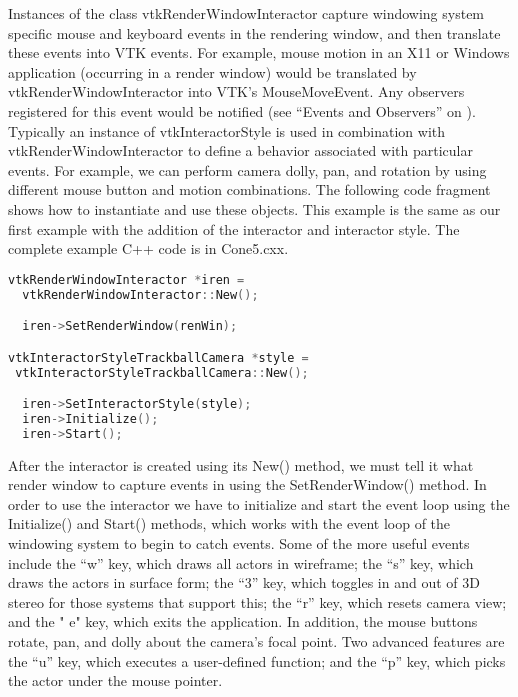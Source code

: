 \begin{description}[leftmargin=0cm,labelindent=0cm]
Instances of the class vtkRenderWindowInteractor capture windowing system specific mouse and keyboard events in the rendering window, and then translate these events into VTK events. For example, mouse motion in an X11 or Windows application (occurring in a render window) would be translated by vtkRenderWindowInteractor into VTK's MouseMoveEvent. Any observers registered for this event would be notified (see ``Events and Observers'' on \pageref{sub:examples_events_observers} ). Typically an instance of vtkInteractorStyle is used in combination with vtkRenderWindowInteractor to define a behavior associated with particular events. For example, we can perform camera dolly, pan, and rotation by using different mouse button and motion combinations. The following code fragment shows how to instantiate and use these objects. This example is the same as our first example with the addition of the interactor and interactor style. The complete example C++ code is in Cone5.cxx.

\begin{lstlisting}[language=C++, caption={Cone5.cxx}]
vtkRenderWindowInteractor *iren =
  vtkRenderWindowInteractor::New();

  iren->SetRenderWindow(renWin);

vtkInteractorStyleTrackballCamera *style =
 vtkInteractorStyleTrackballCamera::New();

  iren->SetInteractorStyle(style);
  iren->Initialize();
  iren->Start();
\end{lstlisting}

After the interactor is created using its New() method, we must tell it what render window to capture events in using the SetRenderWindow() method. In order to use the interactor we have to initialize and start the event loop using the Initialize() and Start() methods, which works with the event loop of the windowing system to begin to catch events. Some of the more useful events include the ``w'' key, which draws all actors in wireframe; the ``s'' key, which draws the actors in surface form; the ``3'' key, which toggles in and out of 3D stereo for those systems that support this; the ``r'' key, which resets camera view; and the " e" key, which exits the application. In addition, the mouse buttons rotate, pan, and dolly about the camera's focal point. Two advanced features are the ``u'' key, which executes a user-defined function; and the ``p'' key, which picks the actor under the mouse pointer.


\end{description}
